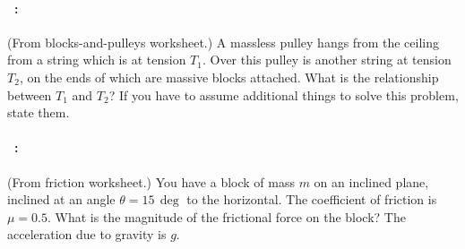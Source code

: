 \documentclass[12pt]{article}
\begin{document}
\vfill

\paragraph{\problemname~\theproblem:}%
(From blocks-and-pulleys worksheet.) A massless pulley hangs from the
ceiling from a string which is at tension $T_1$. Over this pulley is another
string at tension $T_2$, on the ends of which are massive blocks attached. What is the
relationship between $T_1$ and $T_2$? If you have to assume additional things to
solve this problem, state them.

\vfill

\paragraph{\problemname~\theproblem:}%
(From friction worksheet.) You have a block of mass $m$ on an inclined
plane, inclined at an angle $\theta=15\,\deg$ to the horizontal. The
coefficient of friction is $\mu=0.5$. What is the magnitude of the
frictional force on the block? The acceleration due to gravity is $g$.

\vfill
~
\end{document}
